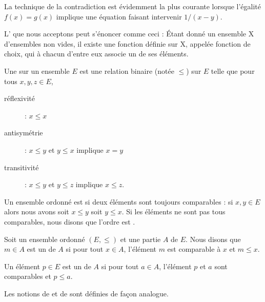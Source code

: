 La technique de la contradiction est évidemment la plus courante lorsque l'égalité \( f(x)=g(x)\) implique une équation faisant intervenir \( 1/(x-y)\).

\begin{normaltext}\label{NORooLMBYooYjUoju}
L' que nous acceptons peut s'énoncer comme ceci\cite{ooKLIXooHbpufL} : Étant donné un ensemble X d'ensembles non vides, il existe une fonction définie sur X, appelée fonction de choix, qui à chacun d'entre eux associe un de ses éléments.
\end{normaltext}

\begin{definition}      \label{DefooFLYOooRaGYRk}
    Une  sur un ensemble \( E\) est une relation binaire (notée \( \leq\)) sur \( E\) telle que pour tous \( x,y,z\in E\),
    \begin{description}
        \item[réflexivité] : \( x\leq x\)
         \item[antisymétrie] : \( x\leq y\) et \( y\leq x\) implique \( x=y\)
         \item[transitivité] : \( x\leq y\) et \( y\leq z\) implique \( x\leq z\).
    \end{description}
\end{definition}

\begin{definition}      \label{DEFooVGYQooUhUZGr}
    Un ensemble ordonné est  si deux éléments sont toujours comparables : si \( x,y\in E\) alors nous avons soit \( x\leq y\) soit \( y\leq x\). Si les éléments ne sont pas tous comparables, nous disons que l'ordre est .
\end{definition}

\begin{definition}
    Soit un ensemble ordonné \( (E,\leq)\) et une partie \( A\) de \( E\). Nous disons que \( m\in A\) est un  de \( A\) si pour tout \( x\in A\), l'élément \( m\) est comparable à \( x\) et \( m\leq x\).

    Un élément \( p\in E\) est un  de \( A\) si pour tout \( a\in A\), l'élément \( p\) et \( a\) sont comparables et \( p\leq a\).

    Les notions de  et de  sont définies de façon analogue.
\end{definition}

